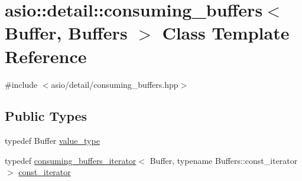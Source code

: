 \hypertarget{classasio_1_1detail_1_1consuming__buffers}{}\section{asio\+:\+:detail\+:\+:consuming\+\_\+buffers$<$ Buffer, Buffers $>$ Class Template Reference}
\label{classasio_1_1detail_1_1consuming__buffers}


{\ttfamily \#include $<$asio/detail/consuming\+\_\+buffers.\+hpp$>$}

\subsection*{Public Types}
\begin{DoxyCompactItemize}
\item 
typedef Buffer \hyperlink{classasio_1_1detail_1_1consuming__buffers_a3063fd648bf703fb9c861db934f61ed5}{value\+\_\+type}
\item 
typedef \hyperlink{classasio_1_1detail_1_1consuming__buffers__iterator}{consuming\+\_\+buffers\+\_\+iterator}$<$ Buffer, typename Buffers\+::const\+\_\+iterator $>$ \hyperlink{classasio_1_1detail_1_1consuming__buffers_a0abc4cc4aed2717a1de4b38d78f3d525}{const\+\_\+iterator}
\end{DoxyCompactItemize}
